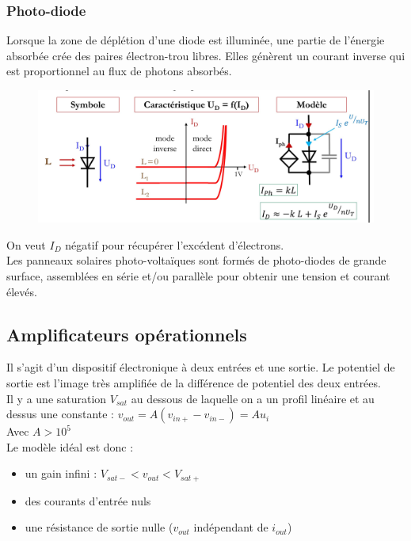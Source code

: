 \documentclass[../main.tex]{subfiles}
\begin{document}
\subsubsection{Photo-diode}
Lorsque la zone de déplétion d'une diode est illuminée, une partie de l'énergie absorbée crée des paires électron-trou libres. Elles génèrent un courant inverse qui est proportionnel au flux de photons absorbés.\\

\begin{figure}[hbt!]
    \centering
    \includegraphics[width=\textwidth]{IMAGES/elec/IMG_0130.jpeg}
\end{figure}
On veut $I_D$ négatif pour récupérer l'excédent d'électrons.\\
Les panneaux solaires photo-voltaïques sont formés de photo-diodes de grande surface, assemblées en série et/ou parallèle pour obtenir une tension et courant élevés.\\

\subsection{Amplificateurs opérationnels}
Il s'agit d'un dispositif électronique à deux entrées et une sortie. Le potentiel de sortie est l'image très amplifiée de la différence de potentiel des deux entrées.\\

Il y a une saturation $V_{sat}$ au dessous de laquelle on a un profil linéaire et au dessus une constante : $v_{out} = A(v_{in+}-v_{in-}) = Au_i$\\
Avec $A>10^5$\\

Le modèle idéal est donc : \begin{itemize}
    \item un gain infini : $V_{sat-}<v_{out}<V_{sat+}$\\
    \item des courants d'entrée nuls\\
    \item une résistance de sortie nulle ($v_{out}$ indépendant de $i_{out}$)\\
\end{itemize}
\end{document}
